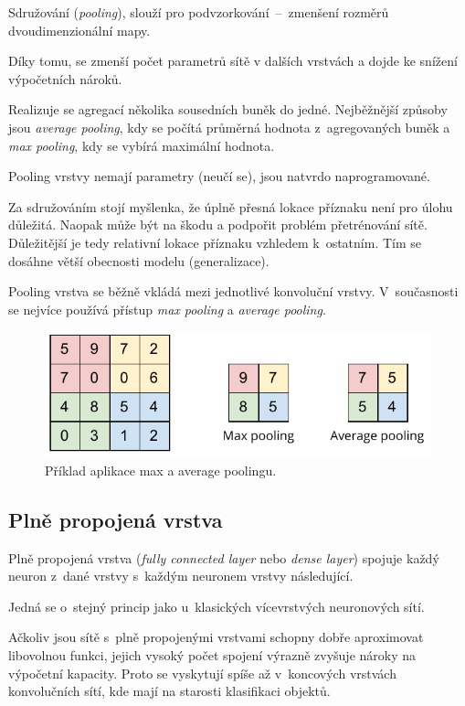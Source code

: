 \begin{compactitem}
    \item Sdružování (\textit{pooling}), slouží pro podvzorkování~--~zmenšení rozměrů dvoudimenzionální mapy.

    \item Díky tomu, se zmenší počet parametrů sítě v dalších vrstvách a dojde ke snížení výpočetních nároků.

    \item Realizuje se agregací několika sousedních buněk do jedné. Nejběžnější způsoby jsou \textit{average pooling}, kdy se počítá průměrná hodnota z~agregovaných buněk a \textit{max pooling}, kdy se vybírá maximální hodnota.

    \item Pooling vrstvy nemají parametry (neučí se), jsou natvrdo naprogramované.

    \item Za sdružováním stojí myšlenka, že úplně přesná lokace příznaku není pro úlohu důležitá. Naopak může být na škodu a podpořit problém přetrénování sítě. Důležitější je tedy relativní lokace příznaku vzhledem k~ostatním. Tím se dosáhne větší obecnosti modelu (generalizace).

    \item Pooling vrstva se běžně vkládá mezi jednotlivé konvoluční vrstvy. V~současnosti se nejvíce používá přístup \textit{max pooling} a \textit{average pooling}.
\end{compactitem}

\begin{figure}[H]
    \centering
    \includegraphics[width=0.7\linewidth]{pooling.pdf}
    \caption{Příklad aplikace max a average poolingu.}
\end{figure}

\subsection{Plně propojená vrstva}

\begin{compactitem}
    \item Plně propojená vrstva (\textit{fully connected layer} nebo \textit{dense layer}) spojuje každý neuron z~dané vrstvy s~každým neuronem vrstvy následující.

    \item Jedná se o~stejný princip jako u~klasických vícevrstvých neuronových sítí.

    \item Ačkoliv jsou sítě s~plně propojenými vrstvami schopny dobře aproximovat libovolnou funkci, jejich vysoký počet spojení výrazně zvyšuje nároky na výpočetní kapacity. Proto se vyskytují spíše až v~koncových vrstvách konvolučních sítí, kde mají na starosti klasifikaci objektů.
\end{compactitem}

